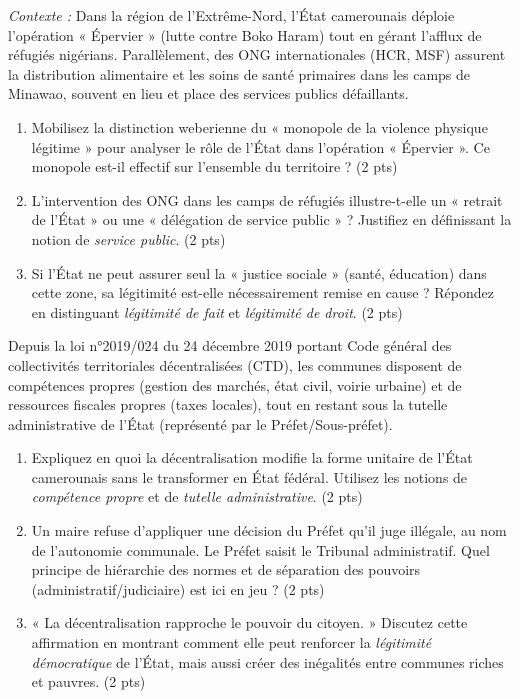 \documentclass[11pt]{article}
\begin{document}
\begin{exercice}
\textit{Contexte :} Dans la région de l'Extrême-Nord, l'État camerounais déploie l'opération « Épervier » (lutte contre Boko Haram) tout en gérant l'afflux de réfugiés nigérians. Parallèlement, des ONG internationales (HCR, MSF) assurent la distribution alimentaire et les soins de santé primaires dans les camps de Minawao, souvent en lieu et place des services publics défaillants.

\begin{enumerate}
    \item Mobilisez la distinction weberienne du « monopole de la violence physique légitime » pour analyser le rôle de l'État dans l'opération « Épervier ». Ce monopole est-il effectif sur l'ensemble du territoire ? \hfill (2 pts)
    \item L'intervention des ONG dans les camps de réfugiés illustre-t-elle un « retrait de l'État » ou une « délégation de service public » ? Justifiez en définissant la notion de \textit{service public}. \hfill (2 pts)
    \item Si l'État ne peut assurer seul la « justice sociale » (santé, éducation) dans cette zone, sa légitimité est-elle nécessairement remise en cause ? Répondez en distinguant \textit{légitimité de fait} et \textit{légitimité de droit}. \hfill (2 pts)
\end{enumerate}
\end{exercice}

\begin{exercice}
Depuis la loi n°2019/024 du 24 décembre 2019 portant Code général des collectivités territoriales décentralisées (CTD), les communes disposent de compétences propres (gestion des marchés, état civil, voirie urbaine) et de ressources fiscales propres (taxes locales), tout en restant sous la tutelle administrative de l'État (représenté par le Préfet/Sous-préfet).

\begin{enumerate}
    \item Expliquez en quoi la décentralisation modifie la forme unitaire de l'État camerounais sans le transformer en État fédéral. Utilisez les notions de \textit{compétence propre} et de \textit{tutelle administrative}. \hfill (2 pts)
    \item Un maire refuse d'appliquer une décision du Préfet qu'il juge illégale, au nom de l'autonomie communale. Le Préfet saisit le Tribunal administratif. Quel principe de hiérarchie des normes et de séparation des pouvoirs (administratif/judiciaire) est ici en jeu ? \hfill (2 pts)
    \item « La décentralisation rapproche le pouvoir du citoyen. » Discutez cette affirmation en montrant comment elle peut renforcer la \textit{légitimité démocratique} de l'État, mais aussi créer des inégalités entre communes riches et pauvres. \hfill (2 pts)
\end{enumerate}
\end{exercice}
\end{document}
